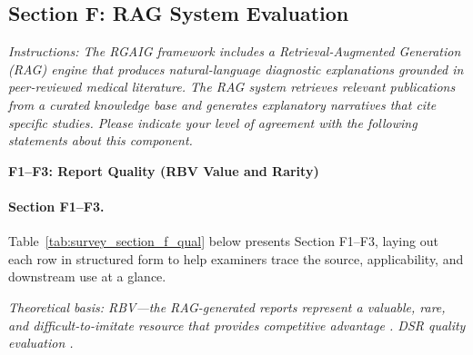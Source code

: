 \subsection{Section F: RAG System Evaluation}
\label{subsec:survey_rag}

\noindent\textit{Instructions: The RGAIG framework includes a Retrieval-Augmented Generation (RAG) engine that produces natural-language diagnostic explanations grounded in peer-reviewed medical literature. The RAG system retrieves relevant publications from a curated knowledge base and generates explanatory narratives that cite specific studies. Please indicate your level of agreement with the following statements about this component.}

\noindent\textbf{F1--F3: Report Quality (RBV Value and Rarity)}
\paragraph{Section F1--F3.}
\noindent Table~\ref{tab:survey_section_f_qual} below presents Section F1--F3, laying out each row in structured form to help examiners trace the source, applicability, and downstream use at a glance. %


\noindent\textit{Theoretical basis: RBV---the RAG-generated reports represent a valuable, rare, and difficult-to-imitate resource that provides competitive advantage \cite{barney1991firm}. DSR quality evaluation \cite{hevner2004design}.}

